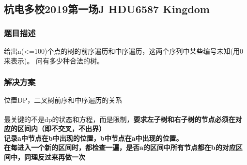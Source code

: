 \subsection{杭电多校2019第一场J HDU6587 Kingdom}
    \subsubsection{题目描述}
        给出n(<=100)个点的树的前序遍历和中序遍历，这两个序列中某些编号未知(用0来表示)。
        问有多少种合法的树。
    \subsubsection{解决方案}
        位置DP，二叉树前序和中序遍历的关系\\\\
        最关键的不是dp的状态和方程，而是限制，\textbf{要求左子树和右子树的节点必须在对应的区间内（即不交叉，不出界）}\\
        \textbf{记录a中节点在b中出现的位置，b中节点在a中出现的位置。}\\
        \textbf{在每进入一个新的区间时，都检查一遍，是否a的区间中所有节点都在b的对应区间中，同理反过来再做一次}\\